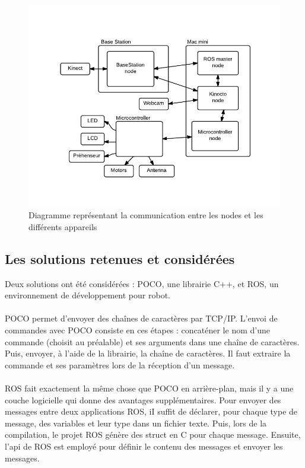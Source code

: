 \begin{figure}[htbp]
\centering
\includegraphics[scale=1]{fig/communicationNodesAppareils.pdf}
\caption{Diagramme représentant la communication entre les nodes et les différents appareils}
\label{fig:commNodes}
\end{figure}

\subsection{Les solutions retenues et considérées}
Deux solutions ont été considérées : POCO, une librairie C++, et ROS, un environnement de développement pour robot.

\paragraph{}POCO permet d’envoyer des chaînes de caractères par TCP/IP. L’envoi de commandes avec POCO consiste en ces étapes : concaténer le nom d’une commande (choisit au préalable) et ses arguments dans une chaîne de caractères. Puis, envoyer, à l’aide de la librairie, la chaîne de caractères. Il faut extraire la commande et ses paramètres lors de la réception d’un message.

\paragraph{}ROS fait exactement la même chose que POCO en arrière-plan, mais il y a une couche logicielle qui donne des avantages supplémentaires. Pour envoyer des messages entre deux applications ROS, iI suffit de déclarer, pour chaque type de message, des variables et leur type dans un fichier texte. Puis, lors de la compilation, le projet ROS génère des struct en C pour chaque message. Ensuite, l’api de ROS est employé pour définir le contenu des messages et envoyer les messages.

